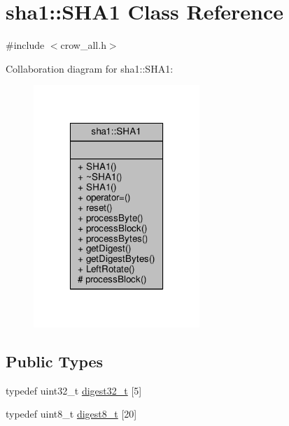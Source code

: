 \hypertarget{classsha1_1_1_s_h_a1}{\section{sha1\-:\-:S\-H\-A1 Class Reference}
\label{classsha1_1_1_s_h_a1}
}


{\ttfamily \#include $<$crow\-\_\-all.\-h$>$}



Collaboration diagram for sha1\-:\-:S\-H\-A1\-:
\nopagebreak
\begin{figure}[H]
\begin{center}
\leavevmode
\includegraphics[width=178pt]{classsha1_1_1_s_h_a1__coll__graph}
\end{center}
\end{figure}
\subsection*{Public Types}
\begin{DoxyCompactItemize}
\item 
typedef uint32\-\_\-t \hyperlink{classsha1_1_1_s_h_a1_a15f384f39d235a8912d5042dc920595f}{digest32\-\_\-t} \mbox{[}5\mbox{]}
\item 
typedef uint8\-\_\-t \hyperlink{classsha1_1_1_s_h_a1_a62b6c7838c4cdcb81700a6cc64fde994}{digest8\-\_\-t} \mbox{[}20\mbox{]}
\end{DoxyCompactItemize}
